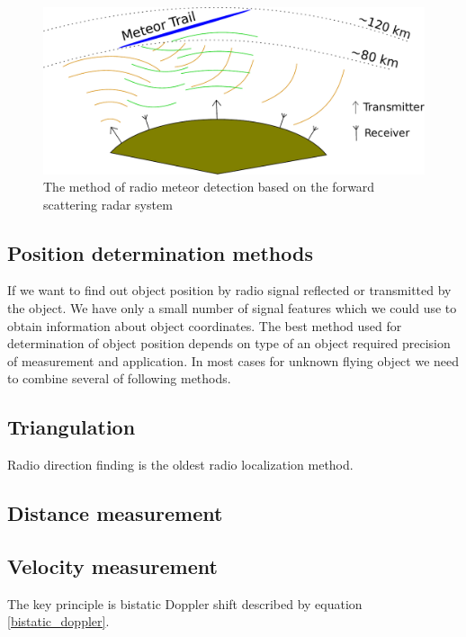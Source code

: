 \documentclass[twoside]{ctuthesis}
\theoremstyle{plain}
\theoremstyle{definition}
\theoremstyle{note}
\begin{document}
\begin{figure}
 \begin{center}
 \includegraphics[width=\linewidth]{./img/Meteor_detection.pdf}
 \caption{The method of radio meteor detection based on the forward scattering radar system}
  \label{fig:forward_scattering} 
 \end{center}
\end{figure}

\subsection{Position determination methods}

If we want to find out object position by radio signal reflected or transmitted by the object. We have only a small number of signal features which we could use to obtain information about object coordinates. The best method used for determination of object position depends on type of an object required precision of measurement and application. In most cases for unknown flying object we need to combine several of following methods. 

\subsection{Triangulation}

Radio direction finding is the oldest radio localization method. 

\subsection{Distance measurement}


\subsection{Velocity measurement}


The key principle is bistatic Doppler shift described by equation \ref{bistatic_doppler}. 
\end{document}
